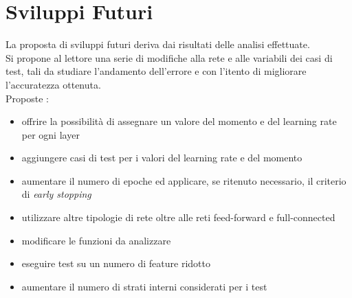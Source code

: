 \chapter{Sviluppi Futuri}
La proposta di sviluppi futuri deriva dai risultati delle analisi effettuate.\\
Si propone al lettore una serie di modifiche alla rete e alle variabili dei casi di test, tali da studiare l'andamento dell'errore e con l'itento di migliorare l'accuratezza ottenuta. \\
Proposte :
\begin{itemize}
    \item offrire la possibilità di assegnare un valore del momento e del learning rate per ogni layer
    \item aggiungere casi di test per i valori del learning rate e del momento
    \item aumentare il numero di epoche ed applicare, se ritenuto necessario, il criterio di \textit{early stopping}
    \item utilizzare altre tipologie di rete oltre alle reti feed-forward e full-connected
    \item modificare le funzioni da analizzare
    \item eseguire test su un numero di feature ridotto
    \item aumentare il numero di strati interni considerati per i test
\end{itemize}